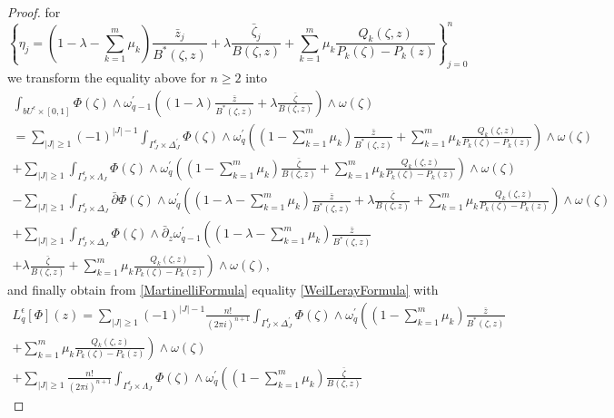\documentclass[11pt,reqno]{amsart}
\numberwithin{equation}{section}
\begin{document}
\begin{proof}
for
$$\left\{\eta_j=(1-\lambda-\sum_{k=1}^m\mu_k)\frac{\bar z_j}
{B^*(\zeta,z)}+\lambda\frac{\bar\zeta_j}{B(\zeta,z)}
+\sum_{k=1}^m\mu_k\frac{Q_k(\zeta,z)}{P_k(\zeta)-P_k(z)}\right\}_{j=0}^n$$
we transform the equality above for $n\geq 2$ into
\begin{multline}\label{BoundaryIntegral}
\int_{bU^{\epsilon}\times[0,1]}\Phi(\zeta)
\wedge\omega^{\prime}_{q-1}\left((1-\lambda)\frac{\bar z}
{B^*(\zeta,z)}+\lambda\frac{\bar\zeta}{B(\zeta,z)}\right)\wedge\omega(\zeta)\\
=\sum_{|J|\geq 1}(-1)^{|J|-1}
\int_{\Gamma^{\epsilon}_J\times\Delta^{\prime}_J}\Phi(\zeta)
\wedge\omega^{\prime}_q\left((1-\sum_{k=1}^m\mu_k)\frac{\bar z}{B^*(\zeta,z)}
+\sum_{k=1}^m\mu_k\frac{Q_k(\zeta,z)}{P_k(\zeta)-P_k(z)}\right)\wedge\omega(\zeta)\\
+\sum_{|J|\geq 1}\int_{\Gamma^{\epsilon}_J\times\Lambda_J}\Phi(\zeta)
\wedge\omega^{\prime}_q\left((1-\sum_{k=1}^m\mu_k)\frac{\bar\zeta}
{B(\zeta,z)}+\sum_{k=1}^m\mu_k\frac{Q_k(\zeta,z)}{P_k(\zeta)-P_k(z)}\right)
\wedge\omega(\zeta)\\
-\sum_{|J|\geq 1}\int_{\Gamma^{\epsilon}_J\times\Delta_J}
\bar\partial\Phi(\zeta)
\wedge\omega^{\prime}_q\left((1-\lambda-\sum_{k=1}^m\mu_k)\frac{\bar z}{B^*(\zeta,z)}
+\lambda\frac{\bar\zeta}{B(\zeta,z)}+\sum_{k=1}^m\mu_k\frac{Q_k(\zeta,z)}{P_k(\zeta)-P_k(z)}\right)
\wedge\omega(\zeta)\\%
+\sum_{|J|\geq 1}\int_{\Gamma^{\epsilon}_J\times\Delta_J}
\Phi(\zeta)\wedge 
\bar\partial_z\omega^{\prime}_{q-1}\left((1-\lambda-\sum_{k=1}^m\mu_k)
\frac{\bar z}{B^*(\zeta,z)}\right.\\
\left.+\lambda\frac{\bar\zeta}{B(\zeta,z)}
+\sum_{k=1}^m\mu_k\frac{Q_k(\zeta,z)}{P_k(\zeta)-P_k(z)}\right)
\wedge\omega(\zeta),
\end{multline}
and finally obtain from \eqref{MartinelliFormula} equality \eqref{WeilLerayFormula} with
\begin{multline*}
L_q^{\epsilon}\left[\Phi\right](z)=\sum_{|J|\geq 1}(-1)^{|J|-1}\frac{n!}{(2\pi i)^{n+1}}
\int_{\Gamma^{\epsilon}_J\times\Delta^{\prime}_J}\Phi(\zeta)
\wedge\omega^{\prime}_q\left((1-\sum_{k=1}^m\mu_k)\frac{\bar z}{B^*(\zeta,z)}\right.\\
\left.+\sum_{k=1}^m\mu_k\frac{Q_k(\zeta,z)}{P_k(\zeta)-P_k(z)}\right)\wedge\omega(\zeta)\\
+\sum_{|J|\geq 1}\frac{n!}{(2\pi i)^{n+1}}\int_{\Gamma^{\epsilon}_J\times\Lambda_J}\Phi(\zeta)
\wedge\omega^{\prime}_q\left((1-\sum_{k=1}^m\mu_k)\frac{\bar\zeta}{B(\zeta,z)}

\end{multline*}
\end{proof}
\end{document}
